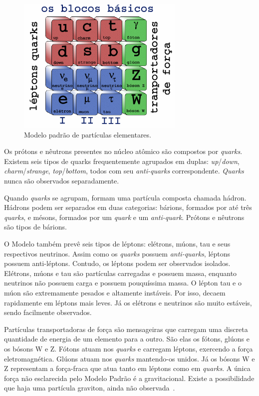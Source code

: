 \begin{figure}[htpb!]
    \centering
    \includegraphics[width=8cm]{images/modelo_padrao.png}
    \caption{Modelo padrão de partículas elementares.}
    \label{fig:modelopadrao}
\end{figure}

Os prótons e nêutrons presentes no núcleo atômico  são compostos por
\emph{quarks}. Existem seis tipos de quarks frequentemente agrupados em duplas:
\emph{up}/\emph{down}, \emph{charm}/\emph{strange}, \emph{top}/\emph{bottom},
todos com seu \emph{anti-quarks} correspondente. \emph{Quarks} nunca são observados
separadamente.

Quando \emph{quarks} se agrupam, formam uma partícula composta chamada hádron.
Hádrons podem ser separados em duas categorias: bárions, formados por até três
\emph{quarks}, e mésons, formados por um \emph{quark} e um \emph{anti-quark}.
Prótons e nêutrons são tipos de bárions.

O Modelo também prevê seis tipos de léptons: elétrons, múons, tau e seus
respectivos neutrinos. Assim como os \emph{quarks} possuem \emph{anti-quarks},
léptons possuem anti-léptons. Contudo, os léptons podem ser observados
isolados. Elétrons, múons e tau são partículas carregadas e possuem massa,
enquanto neutrinos não possuem carga e possuem pouquíssima massa.  O lépton tau
e o múon são extremamente pesados e altamente instáveis. Por isso, decaem
rapidamente em léptons mais leves. Já os elétrons e neutrinos são muito
estáveis, sendo facilmente observados.

Partículas transportadoras de força são mensageiras que carregam uma
discreta quantidade de energia de um elemento para a outro. São elas os fótons, glúons e
os bósons W e Z. Fótons atuam nos \emph{quarks} e carregam léptons, exercendo a força
eletromagnética. Glúons atuam nos \emph{quarks} mantendo-os unidos. Já os bósons
W e Z representam a força-fraca que atua tanto em léptons como em \emph{quarks}.
A única força não esclarecida pelo Modelo Padrão é a gravitacional. Existe a
possibilidade que haja uma partícula graviton, ainda não
observada~\cite{PERKINS2000}.

